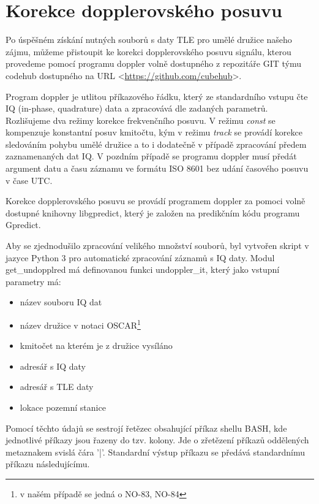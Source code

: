 \section{Korekce dopplerovského posuvu}
  Po úspěšném získání nutných souborů s daty TLE pro umělé družice našeho zájmu, můžeme přistoupit ke korekci dopplerovského posuvu signálu, kterou provedeme pomocí programu doppler volně dostupného z repozitáře GIT týmu codehub dostupného na URL <\url{https://github.com/cubehub}>.

  Program doppler je utlitou příkazového řádku, který ze standardního vstupu čte IQ (in-phase, quadrature) data a zpracovává dle zadaných parametrů. Rozlišujeme dva režimy korekce frekvenčního posuvu. V režimu \emph{const} se kompenzuje konstantní posuv kmitočtu, kým v režimu \emph{track} se provádí korekce sledováním pohybu umělé družice a to i dodatečně v případě zpracování předem zaznamenaných dat IQ. V pozdním případě se programu doppler musí předát argument datu a času záznamu ve formátu ISO 8601 \cite{wiki:timeISO} \cite{github:doppler} bez udání časového posuvu v čase UTC.

  Korekce dopplerovského posuvu se provádí programem doppler za pomoci volně dostupné knihovny libgpredict, který je založen na predikčním kódu programu Gpredict. \cite{github:libgpredict}

  Aby se zjednodušilo zpracování velikého množství souborů, byl vytvořen skript v jazyce Python 3 pro automatické zpracování záznamů s IQ daty. Modul get\_undopplred má definovanou funkci undoppler\_it, který jako vstupní parametry má:
  \begin{itemize}
    \item název souboru IQ dat
    \item název družice v notaci OSCAR\footnote{v našém případě se jedná o NO-83, NO-84}
    \item kmitočet na kterém je z družice vysíláno
    \item adresář s IQ daty
    \item adresář s TLE daty
    \item lokace pozemní stanice
  \end{itemize}

  Pomocí těchto údajů se sestrojí řetězec obsahující příkaz shellu BASH, kde jednotlivé příkazy jsou řazeny do tzv. kolony. Jde o zřetězení příkazů oddělených metaznakem svislá čára '|'. Standardní výstup příkazu se předává standardnímu příkazu následujícímu. \cite{book:Brandejs-unix-linux}


